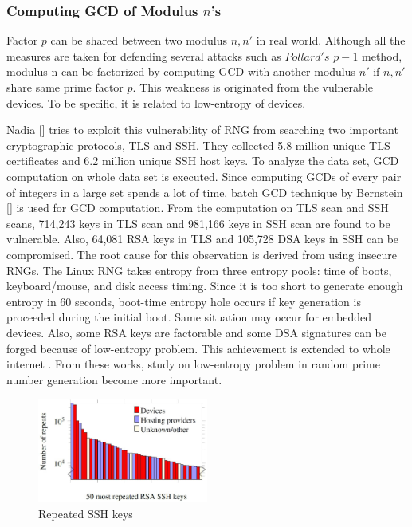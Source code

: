\documentclass[a4paper]{article}
\begin{document}
       

       
\subsubsection*{\textbf{Computing GCD of Modulus $n$'s}} 

Factor $p$ can be shared between two modulus $n,n'$ in real world. Although all the measures are taken for defending several attacks such as $Pollard's$ $p-1$ method, modulus n can be factorized by computing GCD with another modulus $n'$ if $n,n'$ share same prime factor $p$. This weakness is originated from the vulnerable devices. To be specific, it is related to low-entropy of devices.

 Nadia [] tries to exploit this vulnerability of RNG from searching two important cryptographic protocols, TLS and SSH. They collected 5.8 million unique TLS certificates and 6.2 million unique SSH host keys. To analyze the data set, GCD computation on whole data set is executed. Since computing GCDs of every pair of integers in a large set spends a lot of time, batch GCD technique by Bernstein [] is used for GCD computation. From the computation on TLS scan and SSH scans, 714,243 keys in TLS scan and 981,166 keys in SSH scan are found to be vulnerable. Also, 64,081 RSA keys in TLS and 105,728 DSA keys in SSH can be compromised. The root cause for this observation is derived from using insecure RNGs. The Linux RNG takes entropy from three entropy pools: time of boots, keyboard/mouse, and disk access timing. Since it is too short to generate enough entropy in 60 seconds, boot-time entropy hole occurs if key generation is proceeded during the initial boot. Same situation may occur for embedded devices. Also, some RSA keys are factorable and some DSA signatures can be forged because of low-entropy problem. This achievement is extended to whole internet \cite{}. From these works, study on low-entropy problem in random prime number generation become more important.
      
\begin{figure}[t]
   \centering
   \includegraphics[width=0.5\textwidth]{mining1.jpg}
   \caption{Repeated SSH keys \cite{}}
   \label{fig:IGEDec}
\end{figure}           
      
\end{document}
